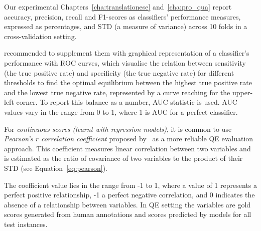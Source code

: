 Our experimental Chapters~\ref{cha:translationese} and~\ref{cha:pro_qua} report accuracy, precision, recall and F1-scores as classifiers' performance measures, expressed as percentages, and \gls{STD} (a measure of variance) across 10 folds in a cross-validation setting.

\citet{Specia2018a} recommended to supplement them with graphical representation of a classifier's performance with \gls{ROC} curves, which visualise the relation between sensitivity (the true positive rate) and specificity (the true negative rate) for different thresholds to find the optimal equilibrium between the highest true positive rate and the lowest true negative rate, represented by a curve reaching for the upper-left corner. To report this balance as a number, \gls{AUC} statistic is used. AUC values vary in the range from 0 to 1, where 1 is AUC for a perfect classifier.

For \textit{continuous scores (learnt with regression models)}, it is common to use \textit{Pearson's $r$ correlation coefficient} proposed by~\cite{Graham2015r} as a more reliable QE evaluation approach. This coefficient measures linear correlation between two variables and is estimated as the ratio of covariance of two variables to the product of their \gls{STD} (see Equation~\ref{eq:pearson}). %



The coefficient value lies in the range from -1 to 1, where a value of 1 represents a perfect positive relationship, -1 a perfect negative correlation, and 0 indicates the absence of a relationship between variables. 
In QE setting the variables are gold scores generated from human annotations and scores predicted by models for all test instances. 

